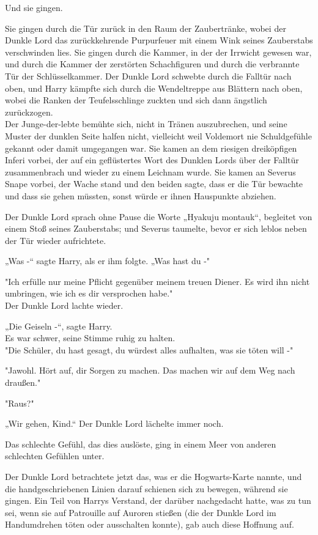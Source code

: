 {Und sie gingen.

Sie gingen durch die Tür zurück in den Raum der Zaubertränke, wobei der Dunkle Lord das zurückkehrende Purpurfeuer mit einem Wink seines Zauberstabs verschwinden lies. Sie gingen durch die Kammer, in der der Irrwicht gewesen war, und durch die Kammer der zerstörten Schachfiguren und durch die verbrannte Tür der Schlüsselkammer. Der Dunkle Lord schwebte durch die Falltür nach oben, und Harry kämpfte sich durch die Wendeltreppe aus Blättern nach oben, wobei die Ranken der Teufelsschlinge zuckten und sich dann ängstlich zurückzogen.\\ Der Junge-der-lebte bemühte sich, nicht in Tränen auszubrechen, und seine Muster der dunklen Seite halfen nicht, vielleicht weil Voldemort nie Schuldgefühle gekannt oder damit umgegangen war. Sie kamen an dem riesigen dreiköpfigen Inferi vorbei, der auf ein geflüstertes Wort des Dunklen Lords über der Falltür zusammenbrach und wieder zu einem Leichnam wurde. Sie kamen an Severus Snape vorbei, der Wache stand und den beiden sagte, dass er die Tür bewachte und dass sie gehen müssten, sonst würde er ihnen Hauspunkte abziehen.

Der Dunkle Lord sprach ohne Pause die Worte „Hyakuju montauk“, begleitet von einem Stoß seines Zauberstabs; und Severus taumelte, bevor er sich leblos neben der Tür wieder aufrichtete.

„Was -“ sagte Harry, als er ihm folgte. „Was hast du -"

"Ich erfülle nur meine Pflicht gegenüber meinem treuen Diener. Es wird ihn nicht umbringen, wie ich es dir versprochen habe."\\ Der Dunkle Lord lachte wieder.

„Die Geiseln -“, sagte Harry.\\ Es war schwer, seine Stimme ruhig zu halten.\\ "Die Schüler, du hast gesagt, du würdest alles aufhalten, was sie töten will -"

"Jawohl. Hört auf, dir Sorgen zu machen. Das machen wir auf dem Weg nach draußen."

"Raus?"

„Wir gehen, Kind.“ Der Dunkle Lord lächelte immer noch.

Das schlechte Gefühl, das dies auslöste, ging in einem Meer von anderen schlechten Gefühlen unter.

Der Dunkle Lord betrachtete jetzt das, was er die Hogwarts-Karte nannte, und die handgeschriebenen Linien darauf schienen sich zu bewegen, während sie gingen. Ein Teil von Harrys Verstand, der darüber nachgedacht hatte, was zu tun sei, wenn sie auf Patrouille auf Auroren stießen (die der Dunkle Lord im Handumdrehen töten oder ausschalten konnte), gab auch diese Hoffnung auf.

}
